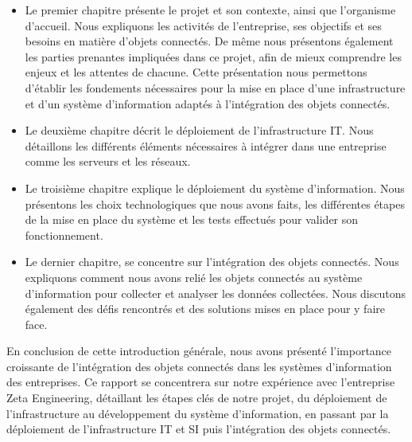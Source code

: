 {\begin{itemize}
  \item Le premier chapitre présente le projet et son contexte, ainsi que l'organisme d'accueil. Nous expliquons les activités de l'entreprise, ses objectifs et ses besoins en matière d'objets connectés. De même nous présentons également les parties prenantes impliquées dans ce projet, afin de mieux comprendre les enjeux et les attentes de chacune. Cette présentation nous permettons d'établir les fondements nécessaires pour la mise en place d'une infrastructure et d'un système d'information adaptés à l'intégration des objets connectés. \\
  \item Le deuxième chapitre décrit le déploiement de l'infrastructure IT. Nous détaillons les différents éléments nécessaires à intégrer dans une entreprise comme les serveurs et les réseaux. \\
  \item Le troisième chapitre explique le déploiement du système d'information. Nous présentons les choix technologiques que nous avons faits, les différentes étapes de la mise en place du système et les tests effectués pour valider son fonctionnement. \\
  \item Le dernier chapitre, se concentre sur l'intégration des objets connectés. Nous expliquons comment nous avons relié les objets connectés au système d'information pour collecter et analyser les données collectées. Nous discutons également des défis rencontrés et des solutions mises en place pour y faire face. \\
\end{itemize}

En conclusion de cette introduction générale, nous avons présenté l'importance croissante de l'intégration des objets connectés dans les systèmes d’information des entreprises. Ce rapport se concentrera sur notre expérience avec l'entreprise Zeta Engineering, détaillant les étapes clés de notre projet, du déploiement de l'infrastructure au développement du système d'information, en passant par la déploiement de l'infrastructure IT et SI puis l'intégration  des objets connectés.



}